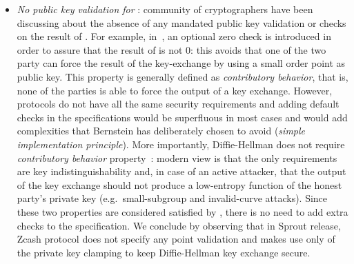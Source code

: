\begin{itemize}
    \item \emph{No public key validation for} : community of cryptographers have been discussing about the absence of any mandated public key validation or checks on the result of . For example, in~\cite[Section 6.1]{rfc7748}, an optional zero check is introduced in order to assure that the result of  is not $0$: this avoids that one of the two party can force the result of the key-exchange by using a small order point as public key. This property is generally defined as \emph{contributory behavior}, that is, none of the parties is able to force the output of a key exchange. However, protocols do not have all the same security requirements and adding default checks in the  specifications would be superfluous in most cases and would add complexities that Bernstein has deliberately chosen to avoid (\emph{simple implementation principle}). More importantly, Diffie-Hellman does not require \emph{contributory behavior} property~\cite{trevorzerocheckcritique}: modern view is that the only requirements are key indistinguishability and, in case of an active attacker, that the output of the key exchange should not produce a low-entropy function of the honest party's private key (e.g.~small-subgroup and invalid-curve attacks). Since these two properties are considered satisfied by , there is no need to add extra checks to the  specification. We conclude by observing that in Sprout release, Zcash protocol does not specify any point validation and makes use only of the private key clamping to keep Diffie-Hellman key exchange secure.
\end{itemize}
